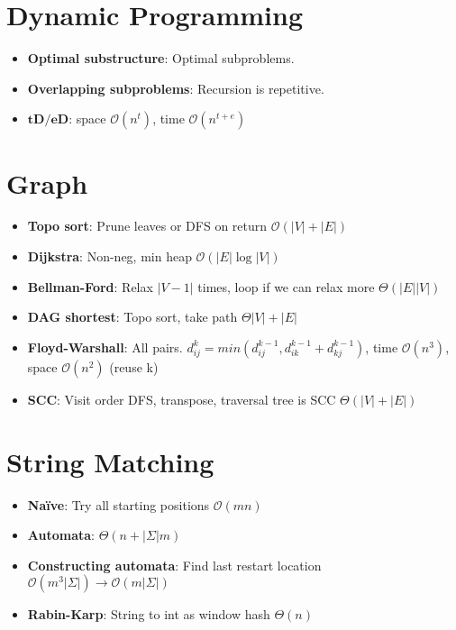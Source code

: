 \documentclass[11pt]{article}
\begin{document}
\section{Dynamic Programming}

\begin{itemize}
	\item \textbf{Optimal substructure}: Optimal subproblems.
	\item \textbf{Overlapping subproblems}: Recursion is repetitive.
	\item $\mathbf{tD / eD}$: space $\mathcal{O}(n^t)$, time $\mathcal{O}(n^{t+e})$
\end{itemize}

\section{Graph}

\begin{itemize}
	\item \textbf{Topo sort}: Prune leaves or DFS on return $\mathcal{O}(|V|+|E|)$
	\item \textbf{Dijkstra}: Non-neg, min heap $\mathcal{O}(|E|\log{|V|})$
	\item \textbf{Bellman-Ford}: Relax $|V-1|$ times, loop if we can relax more $\Theta(\left|E\right|\left|V\right|)$
	\item \textbf{DAG shortest}: Topo sort, take path $\Theta|V|+|E|$
	\item \textbf{Floyd-Warshall}: All pairs. $d^k_{ij} = min(d^{k-1}_{ij}, d^{k-1}_{ik} + d^{k-1}_{kj})$, time $\mathcal{O}(n^3)$, space $\mathcal{O}(n^2)$ (reuse k)
	\item \textbf{SCC}: Visit order DFS, transpose, traversal tree is SCC $\Theta(|V|+|E|)$
\end{itemize}

\section{String Matching}

\begin{itemize}
	\item \textbf{Na\"ive}: Try all starting positions $\mathcal{O}(mn)$
	\item \textbf{Automata}: $\Theta(n+|\Sigma|m)$
	\item \textbf{Constructing automata}: Find last restart location $\mathcal{O}(m^3|\Sigma|) \rightarrow \mathcal{O}(m|\Sigma|)$
	\item \textbf{Rabin-Karp}: String to int as window hash $\Theta(n)$
\end{itemize}
\end{document}
